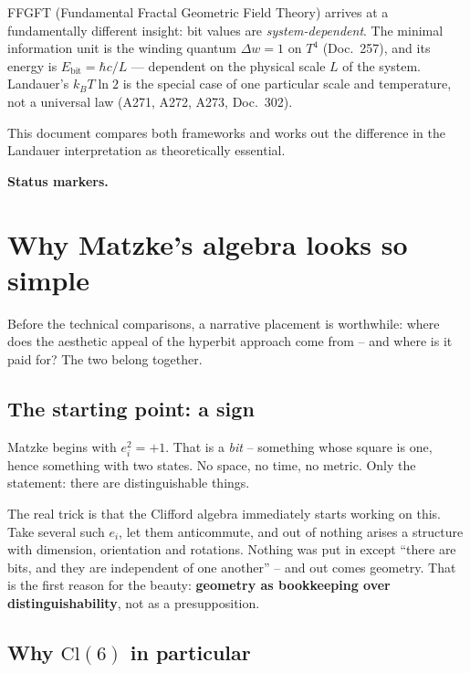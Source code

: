 FFGFT (Fundamental Fractal Geometric Field Theory) arrives at a
fundamentally different insight: bit values are \emph{system-dependent}.
The minimal information unit is the winding quantum $\Delta w = 1$ on $T^4$
(Doc.\ 257), and its energy is $E_{\mathrm{bit}} = \hbar c/L$ — dependent on
the physical scale $L$ of the system. Landauer's $k_B T \ln 2$ is the
special case of one particular scale and temperature, not a universal law
(A271, A272, A273, Doc.\ 302).

This document compares both frameworks and works out the difference in
the Landauer interpretation as theoretically essential.

\medskip\noindent\textbf{Status markers.}


\section{Why Matzke's algebra looks so simple}

Before the technical comparisons, a narrative placement is worthwhile:
where does the aesthetic appeal of the hyperbit approach come from --
and where is it paid for? The two belong together.

\subsection*{The starting point: a sign}

Matzke begins with $e_i^2 = +1$. That is a \emph{bit} -- something whose
square is one, hence something with two states. No space, no time, no
metric. Only the statement: there are distinguishable things.

The real trick is that the Clifford algebra immediately starts working
on this. Take several such $e_i$, let them anticommute, and out of
nothing arises a structure with dimension, orientation and rotations.
Nothing was put in except \enquote{there are bits, and they are
independent of one another} -- and out comes geometry. That is the first
reason for the beauty: \textbf{geometry as bookkeeping over
distinguishability}, not as a presupposition.

\subsection*{Why $\mathrm{Cl}(6)$ in particular}

